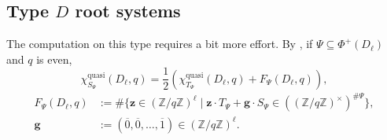 \documentclass[12pt]{amsart}
\theoremstyle{plain}
\theoremstyle{definition}
\theoremstyle{remark}
\newcommand{\Z}{\mathbb{Z}}
\newcommand{\quasi}{\operatorname{quasi}}
\begin{document}
\subsection{Type $D$ root systems} 
The computation on this type requires a bit more effort.
By \cite[Theorem 4.1]{KTT07}, if $\Psi\subseteq\Phi^+(D_\ell)$ and $q$ is even,
\begin{equation}\label{eq:D-TS}
\chi^{\quasi}_{S_\Psi}(D_\ell, q)=\frac12\left( \chi^{\quasi}_{T_\Psi}(D_\ell, q)+F_\Psi(D_\ell, q)\right),
\end{equation}
\begin{align*}
F_\Psi(D_\ell, q) & :=\# \{ \textbf{z}\in  (\Z/q\Z)^\ell  \mid \textbf{z}\cdot T_\Psi+\textbf{g}\cdot S_\Psi\in ((\Z/q\Z)^\times)^{\#\Psi}\}, \\
\textbf{g} & := (\overline0,\overline0,\ldots,\overline1) \in  (\Z/q\Z)^\ell .
\end{align*} 
\end{document}
